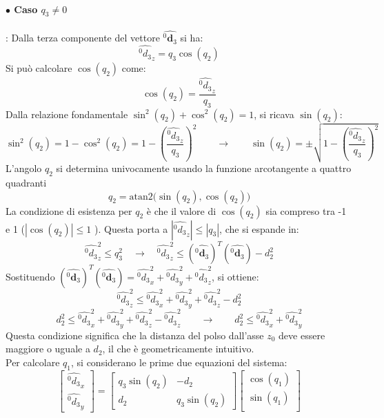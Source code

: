 \documentclass[11pt, a4paper]{report}
\begin{document}
\paragraph{\(\bullet\) Caso \(q_{3} \ne 0\)}: Dalla terza componente del vettore \(\hat{^{0}\mathbf{d}_{3}}\) si ha:
\[
    \hat{^{0}d_{3}}_{z} = q_{3} \cos(q_{2})
\]
Si può calcolare \( \cos(q_{2}) \) come:
\[
    \cos(q_{2}) = \frac{\hat{^{0}d_{3}}_{z}}{q_{3}}
\]
Dalla relazione fondamentale \(\sin^{2}(q_{2}) + \cos^{2}(q_{2}) = 1\), si ricava \(\sin(q_{2})\):
\[
    \sin^{2}(q_{2}) = 1 - \cos^{2}(q_{2}) = 1 - \left(\frac{\hat{^{0}d_{3}}_{z}}{q_{3}}\right)^2
    \qquad\longrightarrow\qquad
    \sin(q_{2})  = \pm\sqrt{1 - \left(\frac{\hat{^{0}d_{3}}_{z}}{q_{3}}\right)^2}
\]
L'angolo \(q_2\) si determina univocamente usando la funzione arcotangente a quattro quadranti
\[
    \boxed{q_{2} = \text{atan2} \biggl( \sin(q_{2}), \cos(q_{2}) \biggr)}
\]
La condizione di esistenza per $q_2$ è che il valore di $\cos(q_2)$ sia compreso tra -1 e 1 (\(|\cos(q_2) | \leq 1\) ). Questa porta a \(|\hat{^{0}d_{3}}_{z}| \leq |q_3|\), che si espande in:
\[
    \hat{^{0}d_{3}}_{z}^{2} \leq q_3^2 \quad \longrightarrow \quad \hat{^{0}d_{3}}_{z}^{2} \leq (\hat{^{0}\mathbf{d}_{3}})^{T} (\hat{^{0}\mathbf{d}_{3}}) - d_{2}^{2}
\]
Sostituendo \((\hat{^{0}\mathbf{d}_{3}})^{T} (\hat{^{0}\mathbf{d}_{3}}) = \hat{^{0}d_{3}}_{x}^2 + \hat{^{0}d_{3}}_{y}^2 + \hat{^{0}d_{3}}_{z}^2\), si ottiene:
\[
    \hat{^{0}d_{3}}_{z}^2 \leq \hat{^{0}d_{3}}_{x}^2 + \hat{^{0}d_{3}}_{y}^2 + \hat{^{0}d_{3}}_{z}^2 - d_{2}^{2}
\]
\[
    d_{2}^{2} \leq \hat{^{0}d_{3}}_{x}^2 + \hat{^{0}d_{3}}_{y}^2 + \hat{^{0}d_{3}}_{z}^2 - \hat{^{0}d_{3}}_{z}^2
    \qquad\longrightarrow\qquad
    d_2^2 \leq \hat{^{0}d_{3}}_{x}^2 + \hat{^{0}d_{3}}_{y}^2
\]
Questa condizione significa che la distanza del polso dall'asse \(z_0\) deve essere maggiore o uguale a \(d_2\), il che è geometricamente intuitivo.\\
Per calcolare \(q_{1}\), si considerano le prime due equazioni del sistema:
\[
    \begin{bmatrix}
        \hat{^{0}d_{3}}_{x}\\
        \hat{^{0}d_{3}}_{y}
    \end{bmatrix}
    =
    \begin{bmatrix}
        q_{3}\sin(q_{2}) & -d_{2}\\
        d_{2} & q_{3}\sin(q_{2})
    \end{bmatrix}
    \begin{bmatrix}
        \cos(q_{1})\\
        \sin(q_{1})\\
    \end{bmatrix}
\]
\end{document}
